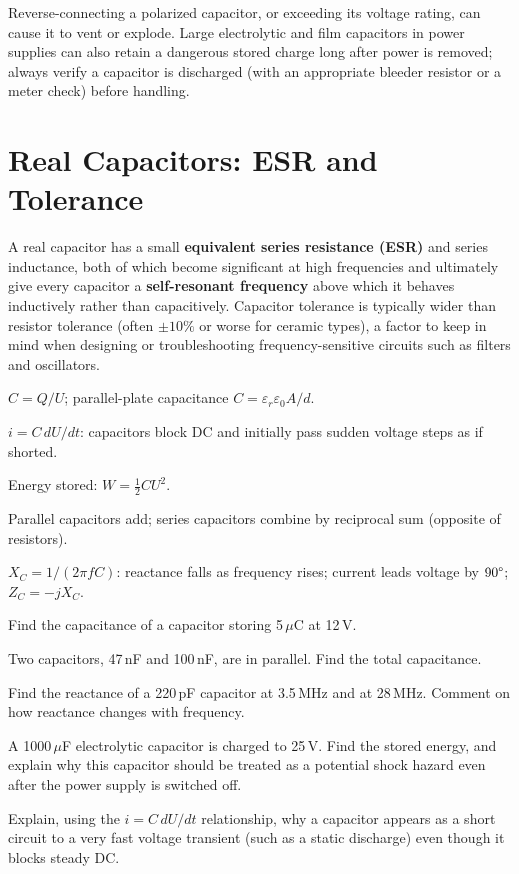 \begin{safetynote}
Reverse-connecting a polarized capacitor, or exceeding its voltage
rating, can cause it to vent or explode. Large electrolytic and film
capacitors in power supplies can also retain a dangerous stored charge
long after power is removed; always verify a capacitor is discharged
(with an appropriate bleeder resistor or a meter check) before handling.
\end{safetynote}

\section{Real Capacitors: ESR and Tolerance}

A real capacitor has a small \textbf{equivalent series resistance (ESR)}
and series inductance, both of which become significant at high
frequencies and ultimately give every capacitor a \textbf{self-resonant
frequency} above which it behaves inductively rather than capacitively.
Capacitor tolerance is typically wider than resistor tolerance (often
$\pm10\%$ or worse for ceramic types), a factor to keep in mind when
designing or troubleshooting frequency-sensitive circuits such as filters
and oscillators.

\begin{quickreview}
\item $C = Q/U$; parallel-plate capacitance $C = \varepsilon_r
\varepsilon_0 A/d$.
\item $i = C\,dU/dt$: capacitors block DC and initially pass sudden
voltage steps as if shorted.
\item Energy stored: $W = \tfrac12 CU^2$.
\item Parallel capacitors add; series capacitors combine by reciprocal
sum (opposite of resistors).
\item $X_C = 1/(2\pi f C)$: reactance falls as frequency rises; current
leads voltage by $90\degree$; $Z_C = -jX_C$.
\end{quickreview}

\begin{practiceproblems}
\item Find the capacitance of a capacitor storing 5\,$\mu$C at 12\,V.
\item Two capacitors, 47\,nF and 100\,nF, are in parallel. Find the total
capacitance.
\item Find the reactance of a 220\,pF capacitor at 3.5\,MHz and at
28\,MHz. Comment on how reactance changes with frequency.
\item A 1000\,$\mu$F electrolytic capacitor is charged to 25\,V. Find the
stored energy, and explain why this capacitor should be treated as a
potential shock hazard even after the power supply is switched off.
\item Explain, using the $i = C\,dU/dt$ relationship, why a capacitor
appears as a short circuit to a very fast voltage transient (such as a
static discharge) even though it blocks steady DC.
\end{practiceproblems}
